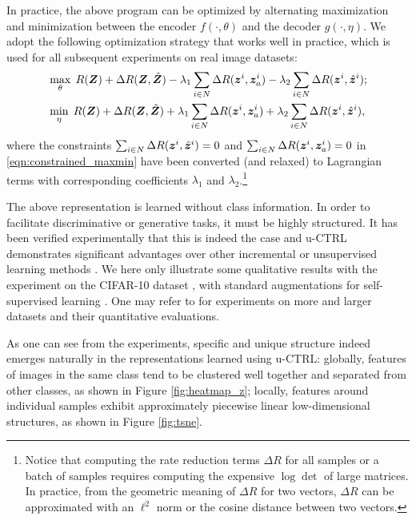 \documentclass[../../book-main.tex]{subfiles}
\begin{document}
In practice, the above program can be optimized by alternating maximization and minimization between the encoder $f(\cdot,\theta)$ and the decoder $g(\cdot,\eta)$. We adopt the following optimization strategy that works well in practice, which is used for all subsequent experiments on real image datasets:
\vspace{-1mm}
\begin{align}
  &  \max_{\theta}\; R(\bm{Z}) + \Delta{R(\bm{Z}, \hat{\bm{Z}})-\lambda_{1}\sum_{i\in N} \Delta R(\bm{z}^i, \bm{z}_{a}^i)} -\lambda_{2}\sum_{i\in N} \Delta R(\bm{z}^i, \hat{\bm{z}}^i) \label{eqn:constrained_max}; \\
   & \min_{\eta}\; R(\bm{Z}) + \Delta{R(\bm{Z}, \hat{\bm{Z}})+\lambda_{1}\sum_{i\in N} \Delta R(\bm{z}^i, \bm{z}_{a}^i)+ \lambda_{2}\sum_{i\in N} \Delta R(\bm{z}^i, \hat{\bm{z}}^i)} \label{eqn:constrained_min}, 
\end{align}
where the constraints $\sum_{i\in N} \Delta R(\bm{z}^i, \hat{\bm{z}}^i) = 0$ and $\sum_{i\in N} \Delta R(\bm{z}^i, \bm{z}_{a}^i) = 0$ in \eqref{eqn:constrained_maxmin} have been converted (and relaxed) to Lagrangian terms with corresponding coefficients $\lambda_{1}$ and  $\lambda_{2}$.\footnote{Notice that computing the rate reduction terms $\Delta R$ for all samples or a batch of samples requires computing the expensive $\log\det$ of large matrices. In practice, from the geometric meaning of $\Delta R$ for two vectors, $\Delta R$ can be approximated with an $\ell^2$ norm or the cosine distance between two vectors.}

The above representation is learned without class information. In order to facilitate discriminative or generative tasks, it must be highly structured. It has been verified experimentally that this is indeed the case and u-CTRL demonstrates significant advantages over other incremental or unsupervised learning methods \cite{pmlr-v234-tong24a}. We here only illustrate some qualitative results with the experiment on the CIFAR-10 dataset \cite{krizhevsky2014cifar}, with standard augmentations for self-supervised learning \cite{chen2020simple}. One may refer to \cite{pmlr-v234-tong24a} for experiments on more and larger datasets and their quantitative evaluations. 

As one can see from the experiments, specific and unique structure indeed emerges naturally in the representations learned using u-CTRL: globally, features of images in the same class tend to be clustered well together and separated from other classes, as shown in Figure \ref{fig:heatmap_z}; locally, features around individual samples exhibit approximately piecewise linear low-dimensional structures, as shown in Figure \ref{fig:tsne}. 
\end{document}
